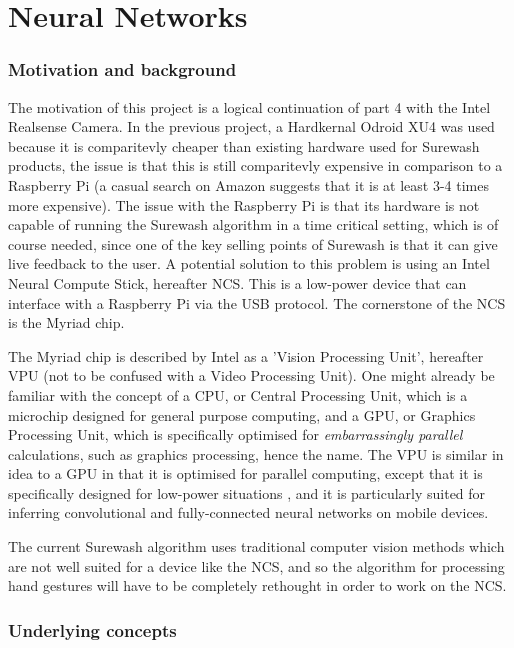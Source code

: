 \part{Neural Networks}
\section{Motivation and background}
The motivation of this project is a logical continuation of part 4 with the Intel Realsense Camera. In the previous project, a Hardkernal Odroid XU4 was used because it is comparitevly cheaper than existing hardware used for Surewash products, the issue is that this is still comparitevly expensive in comparison to a Raspberry Pi (a casual search on Amazon suggests that it is at least 3-4 times more expensive). The issue with the Raspberry Pi is that its hardware is not capable of running the Surewash algorithm in a time critical setting, which is of course needed, since one of the key selling points of Surewash is that it can give live feedback to the user. A potential solution to this problem is using an Intel Neural Compute Stick, hereafter NCS. This is a low-power device that can interface with a Raspberry Pi via the USB protocol. The cornerstone of the NCS is the Myriad chip.

The Myriad chip is described by Intel as a 'Vision Processing Unit', hereafter VPU (not to be confused with a Video Processing Unit). One might already be familiar with the concept of a CPU, or Central Processing Unit, which is a microchip designed for general purpose computing, and a GPU, or Graphics Processing Unit, which is specifically optimised for {\slshape embarrassingly parallel} calculations, such as graphics processing, hence the name. The VPU is similar in idea to a GPU in that it is optimised for parallel computing, except that it is specifically designed for low-power situations \cite{7024073}, and it is particularly suited for inferring convolutional and fully-connected neural networks on mobile devices.

The current Surewash algorithm uses traditional computer vision methods which are not well suited for a device like the NCS, and so the algorithm for processing hand gestures will have to be completely rethought in order to work on the NCS.

\section{Underlying concepts}
